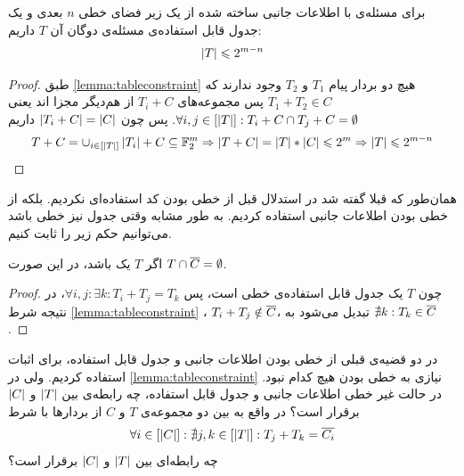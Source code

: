 \begin{theorem}
	برای مسئله‌ی
	\picod
	با اطلاعات جانبی ساخته شده از یک زیر فضای خطی
	$n$
	بعدی و یک جدول قابل استفاده‌ی مسئله‌ی دوگان آن
	$T$
	داریم:
	\begin{align*}
		\left|{T}\right| \leqslant 2^{m - n}
	\end{align*}
\end{theorem}
\begin{proof}
	طبق
	\autoref{lemma:tableconstraint}
	هیچ دو بردار پیام
	$T_1$
	و
	$T_2$
	وجود ندارند که
	$T_1 + T_2 \in C$
	پس مجموعه‌های
	$T_i + C$
	از هم‌دیگر مجزا اند یعنی
	$\forall i, j \in [\left|{T}\right|]: T_i + C \cap T_j + C = \emptyset$.
 پس چون
	$\left|{T_i + C}\right| = \left|{C}\right|$
	داریم
	\begin{align}
	T + C =  \cup_{i \in [\left|{T}\right|]} \left|{T_i}\right| + C \subseteq \mathbb{F}_2^m \Rightarrow \left|{T + C}\right| = \left|{T }\right| * \left|{C}\right| \leqslant 2^m \Rightarrow \left|{T}\right| \leqslant 2^{m - n}
		\end{align}
\end{proof}

همان‌طور که قبلا گفته شد در استدلال قبل از خطی بودن کد استفاده‌ای نکردیم. بلکه از خطی بودن اطلاعات جانبی استفاده کردیم. به طور مشابه وقتی جدول نیز خطی باشد می‌توانیم حکم زیر را ثابت کنیم.
\begin{theorem}
	اگر 
	$T$
	یک 
	باشد، در این صورت
	$T \cap \overline{C} = \emptyset$.
\end{theorem}
\begin{proof}
	چون
	$T$
	یک جدول قابل استفاده‌ی خطی است، پس
	$\forall i, j: \exists k: T_i + T_j = T_k$،
	در نتیجه شرط
	\autoref{lemma:tableconstraint}
	،
	$T_i + T_j \notin \overline{C}$،
	تبدیل می‌شود به
	$\nexists k: T_k \in \overline{C}$.
\end{proof}

\begin{openproblem}
	در دو قضیه‌ی قبلی از خطی بودن اطلاعات جانبی و جدول قابل استفاده، برای اثبات استفاده کردیم. ولی در
	\autoref{lemma:tableconstraint}
	نیازی به خطی بودن هیچ کدام نبود. در حالت غیر خطی اطلاعات جانبی و جدول قابل استفاده، چه رابطه‌ی بین
	$\left|{T}\right|$
	و
	$\left|{C}\right|$
	برقرار است؟ در واقع به بین دو مجموعه‌ی
	$T$
	و
	$C$
	 از بردارها با شرط
 	\begin{align}
	 	\forall i \in [\left|{C}\right|]: \nexists j, k \in [\left|{T}\right|]: T_j + T_k = \overline{C_i}
	 \end{align}
	 چه رابطه‌ای بین
	 	$\left|{T}\right|$
	 و
	 $\left|{C}\right|$
	 برقرار است؟
\end{openproblem}















